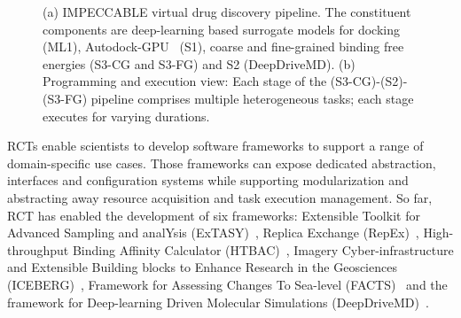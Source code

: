 \documentclass[preprint,12pt, a4paper]{elsarticle}
\begin{document}
\begin{figure}[h]
        \centering
        \qquad
        \caption{(a) IMPECCABLE virtual drug discovery pipeline. The constituent
        components are deep-learning based surrogate models for docking (ML1),
        Autodock-GPU~\cite{legrand2020gpu} (S1), coarse and fine-grained binding
        free energies (S3-CG and S3-FG) and S2 (DeepDriveMD). (b) Programming
        and execution view: Each stage of the (S3-CG)-(S2)-(S3-FG) pipeline
        comprises multiple heterogeneous tasks; each stage executes for varying
        durations.}\label{fig:impeccable}
\end{figure}

RCTs enable scientists to develop software frameworks to support a range of
domain-specific use cases. Those frameworks can expose dedicated abstraction,
interfaces and configuration systems while supporting modularization and
abstracting away resource acquisition and task execution management. So far, RCT
has enabled the development of six frameworks: Extensible Toolkit for
Advanced Sampling and analYsis (ExTASY)~\cite{balasubramanian2016extasy},
Replica Exchange (RepEx)~\cite{treikalis2016repex}, High-throughput Binding
Affinity Calculator (HTBAC)~\cite{dakka2018high}, Imagery Cyber-infrastructure
and Extensible Building blocks to Enhance Research in the Geosciences
(ICEBERG)~\cite{paraskevakos2019workflow}, Framework for Assessing Changes To
Sea-level (FACTS)~\cite{kopp2023framework} and the framework for Deep-learning
Driven Molecular Simulations (DeepDriveMD)~\cite{lee2019deepdrivemd}.
\end{document}
